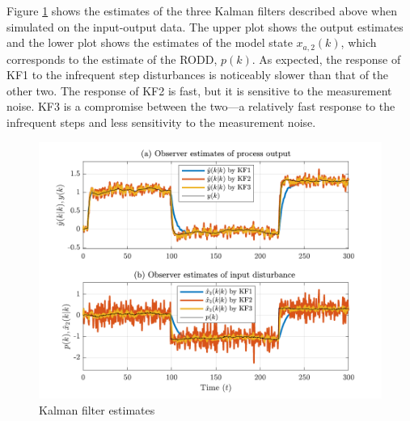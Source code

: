 Figure \ref{fig:sim-sys-siso-KF123-est} shows the estimates of the three Kalman filters described above when simulated on the input-output data. The upper plot shows the output estimates and the lower plot shows the estimates of the model state $x_{a,2}(k)$, which corresponds to the estimate of the \gls{RODD}, $p(k)$. As expected, the response of KF1 to the infrequent step disturbances is noticeably slower than that of the other two. The response of KF2 is fast, but it is sensitive to the measurement noise. KF3 is a compromise between the two—a relatively fast response to the infrequent steps and less sensitivity to the measurement noise.
\begin{figure}[htp]
	\centering
	\includegraphics[width=13cm]{images/rod_obs_sim1_all_seed_y_est1_KF123.pdf}
	\caption{Kalman filter estimates}
	\label {fig:sim-sys-siso-KF123-est}
\end{figure}

